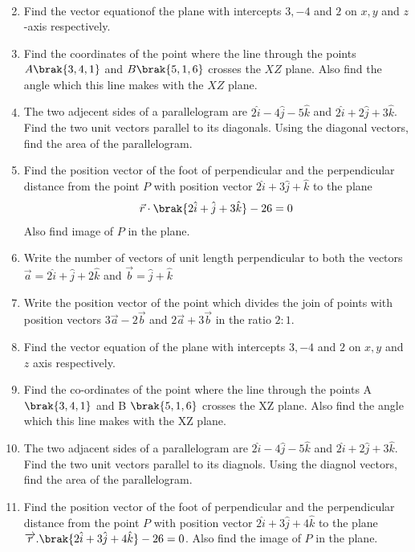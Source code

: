 \begin{enumerate}
\begin{align*}
	      \end{align*}
	\item Find the vector equationof the plane with intercepts $3,-4$ and $2$ on $x,y$ and  $z$-axis respectively.
	\item Find the coordinates of the point where the line through the points $A\brak{3,4,1}$ and $B\brak{5,1,6}$ crosses the $XZ$ plane. Also find the angle which this line makes with the $XZ$ plane.
	\item The two adjecent sides of a parallelogram are $2\hat{i}-4\hat{j}-5\hat{k}$ and $2\hat{i}+2\hat{j}+3\hat{k}$. Find the two unit vectors parallel to its diagonals. Using the diagonal vectors, find the area of the parallelogram.
	\item Find the position vector of the foot of perpendicular and the perpendicular distance from the point $P$ with position vector $2\hat{i}+3\hat{j}+\hat{k}$ to the plane
	      \begin{align*}
		      \vec{r}\cdot\brak{2\hat{i}+\hat{j}+3\hat{k}} - 26=0
	      \end{align*}
	      Also find image of $P$ in the plane.
	\item Write the number of vectors of unit length perpendicular to both the vectors $\overrightarrow{a} = 2\hat{i}+\hat{j} + 2\hat{k}$ and $\overrightarrow{b} = \hat{j} + \hat{k}$
	\item Write the position vector of the point which divides the join of points with position vectors $3\overrightarrow{a} - 2\overrightarrow{b}$ and $2\overrightarrow{a} + 3\overrightarrow{b}$ in the ratio $2:1$.
	\item Find the vector equation of the plane  with intercepts $3, -4$ and $2$ on $x, y$ and $z$ axis respectively.
	\item Find the co-ordinates of the point where the line through the points A $\brak{3,4,1} $ and B $\brak{5,1,6}$ crosses the XZ plane. Also find the angle which this line makes with the XZ plane.
	\item The two adjacent sides of a parallelogram  are $2\hat{i} -4\hat{j} -5\hat{k}$ and $2\hat{i} +2\hat{j} +3\hat{k}$. Find the two unit vectors parallel to its diagnols. Using the diagnol vectors, find the area of the parallelogram.
	\item Find the position vector of the foot of perpendicular and the perpendicular distance from the point $P$ with position vector $2\hat{i} +3\hat{j} + 4\hat{k}$ to the plane $\overrightarrow{r}.\brak{2\hat{i} + 3\hat{j} + 4\hat{k}} - 26 = 0 $. Also find the image of $P$ in the plane.

\end{enumerate}
